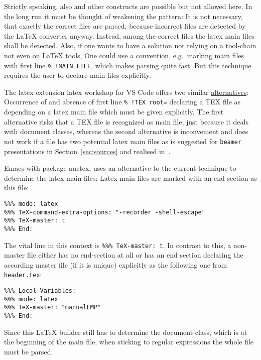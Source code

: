 Strictly speaking, also  %
and other constructs are possible but not allowed here. 
In the long run it must be thought of weakening the pattern: 
It is not necessary, that exactly the correct files are parsed, 
because incorrect files are detected by the \LaTeX{} converter anyway. 
Instead, among the correct files the latex main files shall be detected. 
Also, if one wants to have a solution not relying on a tool-chain 
not even on \LaTeX{} tools, 
One could use a convention, e.g.~marking main files with first line \texttt{\%~!MAIN FILE}, 
which makes parsing quite fast. 
But this technique requires the user to declare main files explicitly. 

The latex extension latex workshop for VS Code offers two similar 
\href{https://github.com/James-Yu/LaTeX-Workshop/wiki/Compile#multi-file-projects}{alternatives}: 
Occurrence of  and 
absence of first line \texttt{\%~!TEX root=} declaring a TEX file as depending on a latex main file 
which must be given explicitly. 
The first alternative risks that a TEX file is recognized as main file, 
just because it deals with document classes, 
whereas the second alternative is inconvenient 
and does not work if a file has two potential latex main files 
as is suggested for \texttt{beamer} presentations in Section~\ref{sec:sources} 
and realised in~\cite{PresBeamer}. 

Emacs with package auctex, uses an alternative
to the current technique to determine the latex main files: 
Latex main files are marked with an end section as this file: 
%
\begin{Verbatim}[fontsize=\footnotesize]
%%% Local Variables: 
%%% mode: latex
%%% TeX-command-extra-options: "-recorder -shell-escape" 
%%% TeX-master: t
%%% End: 
\end{Verbatim}
% 
The vital line in this context is \texttt{\%\%\% TeX-master: t}. 
In contrast to this, a non-master file 
either has no end-section at all or has an end section 
declaring the according master file (if it is unique) 
explicitly as the following one from \texttt{header.tex}: 
%
\begin{verbatim}
%%% Local Variables:
%%% mode: latex
%%% TeX-master: "manualLMP"
%%% End:
\end{verbatim}

Since this \LaTeX{} builder still has to determine the document class, 
which is at the beginning of the main file, 
when sticking to regular expressions the whole file must be parsed. 



